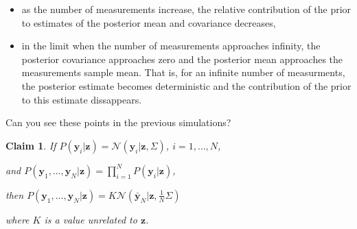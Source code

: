 \documentclass[12pt]{article}
\newtheorem{claim}{Claim}
\begin{document}
\begin{enumerate}[(a)]
        \begin{itemize}

            \item as the number of measurements increase, the relative
                contribution of the prior to estimates of the posterior
                mean and covariance decreases,

            \item in the limit when the number of measurements approaches
                infinity, the posterior covariance approaches zero and the
                posterior mean approaches the measurements sample mean.
                That is, for an infinite number of measurments, the
                posterior estimate becomes deterministic and the
                contribution of the prior to this estimate dissappears.

        \end{itemize}

        Can you see these points in the previous simulations?

\end{enumerate}

\pagebreak

\begin{claim}
    If
    $P(\mathbf{y}_i|\mathbf{z})=\mathcal{N}\left(\mathbf{y}_i|\mathbf{z},\Sigma\right)$,
    $i=1,\ldots,N$, 

    and
    $P(\mathbf{y}_1,\ldots,\mathbf{y}_N|\mathbf{z})=\prod_{i=1}^N
    P(\mathbf{y}_i|\mathbf{z})$, 

    then
    $P(\mathbf{y}_1,\ldots,\mathbf{y}_N|\mathbf{z})=K\mathcal{N}(\bar{\mathbf{y}}_N|\mathbf{z},\frac{1}{N}\Sigma)$
    \label{claim:likelihoodForZ}

    where $K$ is a value unrelated to $\mathbf{z}$.
\end{claim}
\end{document}
